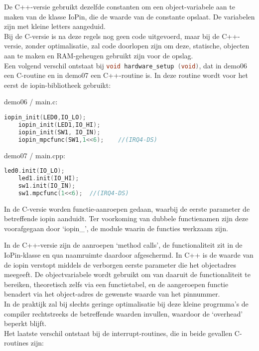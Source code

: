 \documentclass[a4paper, 11pt, fleqn, twoside]{scrartcl}%
\begin{document}
De C++-versie gebruikt dezelfde constanten om een object-variabele aan te maken 
van de klasse IoPin, die de waarde van de constante opslaat. De variabelen
zijn met kleine letters aangeduid.\\

Bij de C-versie is na deze regels nog geen code uitgevoerd, maar bij de 
C++-versie, zonder optimalisatie, zal code doorlopen zijn om deze, statische,
objecten aan te maken en RAM-geheugen gebruikt zijn voor de opslag.\\[1ex]

Een volgend verschil ontstaat bij 
\lstinline[language=C]!void hardware_setup (void)!, dat in demo06 een C-routine
en in demo07 een C++-routine is.
In deze routine wordt voor het eerst de iopin-bibliotheek gebruikt:

demo06 / main.c:
\begin{lstlisting}[language=C,backgroundcolor=\color{orange!10},framerule=0pt,columns=fixed]
	iopin_init(LED0,IO_LO);
	iopin_init(LED1,IO_HI);
	iopin_init(SW1, IO_IN);
	iopin_mpcfunc(SW1,1<<6);	//(IRQ4-DS)
\end{lstlisting}
demo07 / main.cpp:
\begin{lstlisting}[language=C,backgroundcolor=\color{orange!10},framerule=0pt,columns=fixed]
	led0.init(IO_LO);
	led1.init(IO_HI);
	sw1.init(IO_IN);
	sw1.mpcfunc(1<<6);	//(IRQ4-DS)
\end{lstlisting}

In de C-versie worden functie-aanroepen gedaan, waarbij de eerste parameter de
betreffende iopin aanduidt. Ter voorkoming van dubbele functienamen zijn deze
voorafgegaan door `iopin\_', de module waarin de functies werkzaam zijn.

In de C++-versie zijn de aanroepen `method calls', de functionaliteit zit in 
de IoPin-klasse en qua naamruimte daardoor afgeschermd. In C++ is de waarde van
de iopin verstopt middels de verborgen eerste parameter die het objectadres
meegeeft. De objectvariabele wordt gebruikt om van daaruit de functionaliteit
te bereiken, theoretisch zelfs via een functietabel, en de aangeroepen functie
benadert via het object-adres de gewenste waarde van het pinnummer.\\

In de praktijk zal bij slechts geringe optimalisatie bij deze kleine progrmma's
de compiler rechtstreeks de betreffende waarden invullen, waardoor de `overhead'
beperkt blijft.\\

Het laatste verschil ontstaat bij de interrupt-routines, die in beide gevallen
C-routines zijn:
\end{document}
